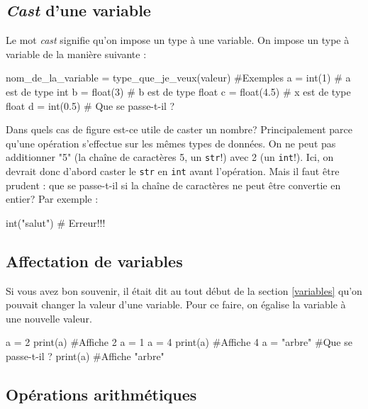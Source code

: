 \subsection{\textit{Cast} d'une variable}
Le mot \textit{cast} signifie qu'on impose un type à une variable. On impose un type à variable de la manière suivante :
\begin{python}[caption = Cast de variables]
nom_de_la_variable = type_que_je_veux(valeur)
#Exemples
a = int(1) # a est de type int
b = float(3) # b est de type float
c = float(4.5) # x est de type float
d = int(0.5) # Que se passe-t-il ?
\end{python}
Dans quels cas de figure est-ce utile de caster un nombre? Principalement parce qu'une opération s'effectue sur les mêmes types de données. On ne peut pas additionner "5" (la chaîne de caractères 5, un \texttt{str}!) avec 2 (un \texttt{int}!). Ici, on devrait donc d'abord caster le \texttt{str} en \texttt{int} avant l'opération. Mais il faut être prudent : que se passe-t-il si la chaîne de caractères ne peut être convertie en entier? Par exemple :
\begin{python}
int("salut") # Erreur!!!
\end{python}


\subsection{Affectation de variables}
Si vous avez bon souvenir, il était dit au tout début de la section \ref{variables} qu'on pouvait changer la valeur d'une variable. Pour ce faire, on égalise la variable à une nouvelle valeur. 
\begin{python}[caption = Réassignation de variables]
a = 2
print(a) #Affiche 2
a = 1
a = 4
print(a) #Affiche 4
a = "arbre" #Que se passe-t-il ?
print(a) #Affiche "arbre"
\end{python}

\subsection{Opérations arithmétiques}

